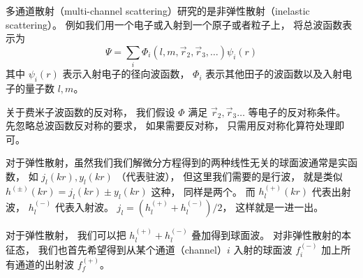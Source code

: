 
多通道散射（multi-channel scattering）研究的是非弹性散射（inelastic scattering）。 例如我们用一个电子或入射到一个原子或者粒子上， 将总波函数表示为
\begin{equation}
\Psi = \sum_i \Phi_i (l, m, \vec r_2, \vec r_3, \dots) \psi_i (r)
\end{equation}
其中 $\psi_i(r)$ 表示入射电子的径向波函数， $\Phi_i$ 表示其他田子的波函数以及入射电子的量子数 $l, m$。

关于费米子波函数的反对称， 我们假设 $\Phi$ 满足 $\vec r_2, \vec r_3 \dots$ 等电子的反对称条件。 先忽略总波函数反对称的要求， 如果需要反对称， 只需用反对称化算符处理即可。

对于弹性散射，虽然我们我们解微分方程得到的两种线性无关的球面波通常是实函数， 如 $j_l(kr), y_l(kr)$ （代表驻波）， 但这里我们需要的是行波， 就是类似 $h^{(\pm)}(kr) = j_l(kr) \pm y_l(kr)$ 这种， 同样是两个。 而 $h_l^{(+)}(kr)$ 代表出射波， $h_l^{(-)}$ 代表入射波。 $j_l = (h_l^{(+)} + h_l^{(-)})/2$， 这样就是一进一出。

对于弹性散射， 我们可以把 $h_l^{(+)} + h_l^{(-)}$ 叠加得到球面波。 对非弹性散射的本征态， 我们也首先希望得到从某个通道（channel）$i$ 入射的球面波 $f_i^{(-)}$ 加上所有通道的出射波 $f_f^{(+)}$。
